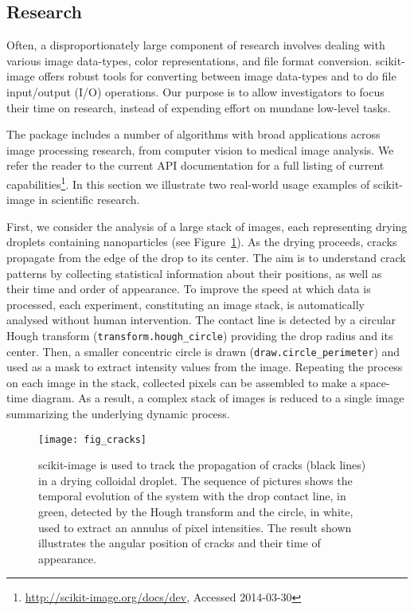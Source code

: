 
  \subsection*{Research}
    \label{sub:research}

    Often, a disproportionately large component of research involves dealing with various image data-types, color representations, and file format conversion. scikit-image offers robust tools for converting between image data-types \citep{DirectX,OpenGL,GraphicsGemsI} and to do file input/output (I/O) operations.  Our purpose is to allow investigators to focus their time on research, instead of expending effort on mundane low-level tasks.

    The package includes a number of algorithms with broad applications across image processing research, from computer vision to medical image analysis. We refer the reader to the current API documentation for a full listing of current capabilities\footnote{\url{http://scikit-image.org/docs/dev}, Accessed 2014-03-30}. In this section we illustrate two real-world usage examples of scikit-image in scientific research.

    First, we consider the analysis of a large stack of images, each representing drying droplets containing nanoparticles (see Figure~\ref{fig:cracks}). As the drying proceeds, cracks propagate from the edge of the drop to its center. The aim is to understand crack patterns by collecting statistical information about their positions, as well as their time and order of appearance. To improve the speed at which data is processed, each experiment, constituting an image stack, is automatically analysed without human intervention. The contact line is detected by a circular Hough transform (\texttt{transform.hough\_circle}) providing the drop radius and its center. Then, a smaller concentric circle is drawn (\texttt{draw.circle\_perimeter}) and used as a mask to extract intensity values from the image. Repeating the process on each image in the stack, collected pixels can be assembled to make a space-time diagram. As a result, a complex stack of images is reduced to a single image summarizing the underlying dynamic process.

    \begin{figure}[bht]
      \texttt{[image: fig\_cracks]}

      \caption{scikit-image is used to track the propagation of cracks (black lines) in a drying colloidal droplet. The sequence of pictures shows the temporal evolution of the system with the drop contact line, in green, detected by the Hough transform and the circle, in white, used to extract an annulus of pixel intensities.  The result shown illustrates the angular position of cracks and their time of appearance. \label{fig:cracks}}
    \end{figure}

